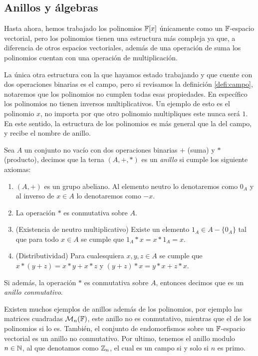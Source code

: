 \subsection{Anillos y álgebras}

Hasta ahora, hemos trabajado los polinomios $\mathbb{F}[x]$ únicamente como un $\mathbb{F}$-espacio vectorial, pero los polinomios tienen una estructura más compleja ya que, a diferencia de otros espacios vectoriales, además de una operación de suma los polinomios cuentan con una operación de multiplicación.

La única otra estructura con la que hayamos estado trabajando y que cuente con dos operaciones binarias es el campo, pero si revisamos la definición \ref{defi:campo}, notaremos que los polinomios no cumplen todas esas propiedades. En específico los polinomios no tienen inversos multiplicativos. Un ejemplo de esto es el polinomio $x$, no importa por que otro polinomio multipliques este nunca será $1$. En este sentido, la estructura de los polinomios es más general que la del campo, y recibe el nombre de anillo.

\begin{defi}
  Sea $A$ un conjunto no vacío con dos operaciones binarias $+$ (suma) y $*$ (producto), decimos que la terna $(A,+,*)$ es un \emph{anillo} si cumple los siguiente axiomas:
  \begin{enumerate}
    \item $(A,+)$ es un grupo abeliano. Al elemento neutro lo denotaremos como $0_A$ y al inverso de $x \in A$ lo denotaremos como $-x$.
    \item La operación $*$ es conmutativa sobre $A$.
    \item (Existencia de neutro multiplicativo) Existe un elemento $1_A \in A-\{0_A\}$ tal que para todo $x \in A$ se cumple que $1_A * x = x * 1_A = x$.
    \item (Distributividad) Para cualesquiera $x, y, z \in A$ se cumple que $x * (y + z) = x * y + x * z$ y $(y + z) * x =   y * x + z * x$.
  \end{enumerate}
  Si además, la operación $*$ es conmutativa sobre $A$, entonces decimos que es un \emph{anillo conmutativo}.
\end{defi}

Existen muchos ejemplos de anillos además de los polinomios, por ejemplo las matrices cuadradas $\mathcal{M}_n(\mathbb{F})$, este anillo no es conmutativo, mientras que el de los polinomios si lo es. También, el conjunto de endomorfismos sobre un $\mathbb{F}$-espacio vectorial es un anillo no conmutativo. Por ultimo, tenemos el anillo modulo $n \in \mathbb{N}$, al que denotamos como $\mathbb{Z}_n$, el cual es un campo si y solo si $n$ es primo.

